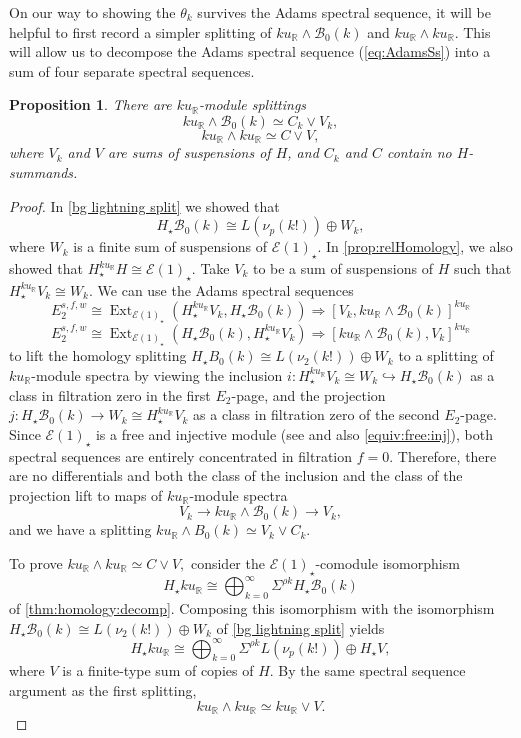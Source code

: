 \documentclass{amsart}
\newtheorem{proposition}[equation]{Proposition}
\theoremstyle{plain}
\numberwithin{equation}{section}
\numberwithin{figure}{section}
\DeclareMathOperator{\Ext}{Ext}
\newcommand{\mR}{{\mathbb R}}
\newcommand{\cB}{{\mathcal B}}
\newcommand{\cE}{{\mathcal E}}
\newcommand{\0}{\langle 0 \rangle }
\begin{document}
On our way to showing the $\theta_k$ survives the Adams spectral sequence, it will be helpful to first record a simpler splitting of $ku_{\mR}\wedge \cB_{0}(k)$ and $ku_{\mR} \wedge ku_{\mR}$. This will allow us to decompose the Adams spectral sequence (\ref{eq:AdamsSs}) into 
a sum of four separate spectral sequences.

\begin{proposition}\label{prop: other splitting}
    There are $ku_\mR$-module splittings
    \[ ku_\mR \wedge \cB_{0}(k) \simeq C_{k} \vee V_{k} ,\]
    \[ ku_\mR \wedge  ku_\mR\simeq C \vee V, \]
 where $V_{k}$ and $ V$ are sums of suspensions of $H$, and $C_{k}$ and $ C$ contain no $H$-summands.
\end{proposition}

\begin{proof}
In \cref{bg lightning split} we showed that \[H_{\star}\cB_{0}(k) \cong L(\nu_{p}(k!)) \oplus W_{k},\] where $W_{k}$ is a finite sum of suspensions of $\cE(1)_{\star}$. In \cref{prop:relHomology}, we also showed that $H_{\star}^{ku_\mR}H \cong \cE(1)_{\star}$. Take $V_{k}$ to be a sum of suspensions of $H$ such that $H_{\star}^{ku_{\mR}}V_{k} \cong W_{k}$. We can use the Adams spectral sequences
\[ E_{2}^{s,f,w} \cong \Ext_{\cE(1)_{\star}}(H_{\star}^{ku_{\mR}}V_{k}, H_{\star}\cB_{0}(k)) \Longrightarrow [V_{k}, ku_\mR \wedge \cB_{0}(k) ]^{ku_{\mR}} \]
\[ E_{2}^{s,f,w} \cong \Ext_{\cE(1)_{\star}}( H_{\star}\cB_{0}(k), H_{\star}^{ku_{\mR}}V_{k}) \Longrightarrow [ ku_\mR \wedge \cB_{0}(k), V_{k} ]^{ku_{\mR}} \]
to lift the homology splitting $H_{\star}B_{0}\left( k \right) \cong L(\nu_{2}(k!)) \oplus W_{k}$ to a splitting of $ku_\mR$-module spectra by viewing the inclusion $i: H_{\star}^{ku_{\mR}}V_{k} \cong W_k \hookrightarrow H_{\star}\cB_{0}(k)$ as a class in filtration zero in the first $E_{2}$-page, and the projection $j: H_{\star}\cB_{0}(k) \to W_k \cong H_{\star}^{ku_{\mR}}V_{k}$ as a class in filtration zero of the second $E_{2}$-page. Since $\cE(1)_\star$ is a free and injective module (see \cite{Ricka15} and also \cref{equiv:free:inj}), both spectral sequences are entirely concentrated in filtration $f=0$. Therefore, there are no differentials and both the class of the inclusion and the class of the projection lift to maps of $ku_{\mR}$-module spectra
\[V_{k} \to ku_{\mR} \wedge \cB_{0}(k) \to V_{k},\]
and we have a splitting $ku_{\mR} \wedge B_{0}(k) \simeq V_{k} \vee C_{k}$.

To prove $ku_\mR \wedge ku_\mR \simeq C \vee V,$
consider the $\cE(1)_\star$-comodule isomorphism
\[
H_\star ku_\mR \cong \bigoplus_{k = 0}^\infty \Sigma^{\rho k} H_\star \cB_{0}(k) 
\]
of \cref{thm:homology:decomp}. Composing this isomorphism with the isomorphism $H_{\star}\cB_{0}\left( k \right) \cong L(\nu_{2}(k!)) \oplus W_{k}$ of \cref{bg lightning split} yields
\[H_{\star}ku_\mR \cong \bigoplus_{k=0}^{\infty}\Sigma^{\rho k}L(\nu_{p}(k!)) \oplus H_{\star}V,\] 
where $V$ is a finite-type sum of copies of $H$. By the same spectral sequence argument as the first splitting, 
\[ ku_\mR \wedge ku_\mR \simeq ku_\mR \vee V .\]
\end{proof}
\end{document}
